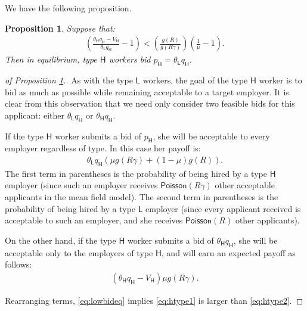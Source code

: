 \documentclass[prodmode,acmec]{ec-acmsmall}
\renewcommand{\H}{\ensuremath{\mathsf{H}}}
\renewcommand{\L}{\ensuremath{\mathsf{L}}}
\newcommand{\poiss}{\ensuremath{\mathsf{Poisson}}}
\newtheorem{prop}{Proposition}
\begin{document}
We have the following proposition.

\begin{prop}
\label{prop:lowbid}
Suppose that:
\begin{align}
\label{eq:lowbideq}
\left ( \frac{\theta_\H q_\H - V_\H}{\theta_\L q_\H} - 1 \right) < \left( \frac{g(R)}{g(R\gamma)}\right) \left( \frac{1}{\mu} - 1\right).
\end{align}
Then in equilibrium, type $\H$ workers bid $p_\H = \theta_\L q_\H$.
\end{prop}

\begin{proof}[of Proposition \ref{prop:lowbid}.]
As with the type $\L$ workers, the goal of the type $\H$ worker is to bid as much as possible while remaining acceptable to a target employer.
It is clear from this observation that we need only consider two feasible bids for this applicant: either $\theta_\L q_\H$ or $\theta_\H q_\H$.

If the type $\H$ worker submits a bid of $p_\H$, she will be acceptable to every employer regardless of type.
In this case her payoff is:
\begin{align}
\label{eq:htype1}
\theta_\L q_\H \left ( \mu g(R \gamma) + (1 - \mu) g(R) \right).  
\end{align}
The first term in parentheses is the probability of being hired by a type $\H$ employer (since such an employer receives $\poiss(R\gamma)$ other acceptable applicants in the mean field model).
The second term in parentheses is the probability of being hired by a type $\L$ employer (since every applicant received is acceptable to such an employer, and she receives $\poiss(R)$ other applicants).  

On the other hand, if the type $\H$ worker submits a bid of $\theta_\H q_\H$, she will be acceptable only to the employers of type $\H$, and will earn an expected payoff as follows:
\begin{align}
\label{eq:htype2}
(\theta_\H q_\H - V_\H)\mu g(R \gamma).  
\end{align}

Rearranging terms, \eqref{eq:lowbideq} implies \eqref{eq:htype1} is larger than \eqref{eq:htype2}.
\end{proof}
\end{document}
